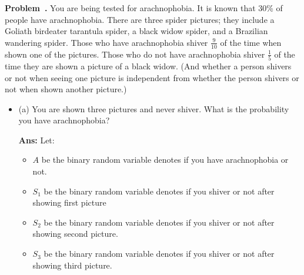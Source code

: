 \documentclass{article}
\newcounter{problem}[section]
\newenvironment{problem}[1][]{\refstepcounter{problem}\par\medskip
   \noindent \textbf{Problem~\theproblem. #1} \rmfamily}{\medskip}
\newenvironment{proof}{\begin{mdframed}\textbf{Ans:}}{ \end{mdframed}}
\begin{document}
\begin{problem}
	You are being tested for arachnophobia. It is known that 30\% of people have arachnophobia. 
	There are three spider pictures; they include a Goliath birdeater tarantula spider, a black widow spider, and a Brazilian wandering spider. Those who have arachnophobia
	 shiver $\frac{9}{10}$ of the time when shown one of the pictures. 
	Those who do not have arachnophobia shiver $\frac{1}{5}$ of the time they are shown a picture of a black widow. 
	(And whether a person shivers or not when seeing one picture is independent from whether the person shivers or not when shown another picture.)
\begin{itemize}
	\item (a) You are shown three pictures and never shiver. What is the probability you have arachnophobia?
	\begin{proof}
		Let:
		\begin{itemize}
			\item 
			$A$ be the binary random variable denotes if you have arachnophobia or not.
			\item 
			$S_1$ be the binary random variable denotes if you shiver or not after showing first picture
			\item 
			$S_2$ be the binary random variable denotes if you shiver or not after showing second picture.
			\item 
			$S_3$ be the binary random variable denotes if you shiver or not after showing third picture.


\end{itemize}
\end{proof}
\end{itemize}
\end{problem}
\end{document}
